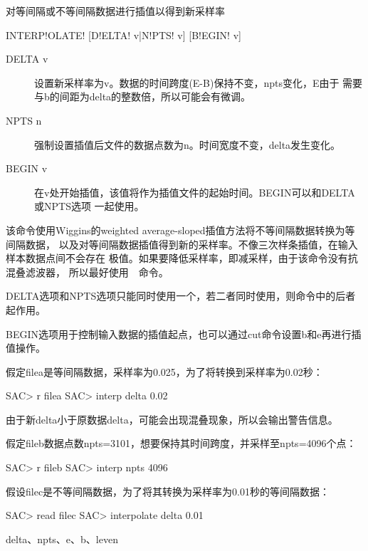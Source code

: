 \label{cmd:interpolate}

对等间隔或不等间隔数据进行插值以得到新采样率

\begin{SACSTX}
INTERP!OLATE! [D!ELTA! v|N!PTS! v] [B!EGIN! v]
\end{SACSTX}

\begin{description}
\item [DELTA v] 设置新采样率为v。数据的时间跨度(E-B)保持不变，npts变化，E由于
    需要与b的间距为delta的整数倍，所以可能会有微调。
\item [NPTS n] 强制设置插值后文件的数据点数为n。时间宽度不变，delta发生变化。
\item [BEGIN v] 在v处开始插值，该值将作为插值文件的起始时间。BEGIN可以和DELTA或NPTS选项
    一起使用。
\end{description}

该命令使用Wiggins的weighted average-sloped插值方法将不等间隔数据转换为等间隔数据，
以及对等间隔数据插值得到新的采样率。不像三次样条插值，在输入样本数据点间不会存在
极值。如果要降低采样率，即减采样，由于该命令没有抗混叠滤波器，
所以最好使用~~命令。

DELTA选项和NPTS选项只能同时使用一个，若二者同时使用，则命令中的后者起作用。

BEGIN选项用于控制输入数据的插值起点，也可以通过cut命令设置b和e再进行插值操作。

假定filea是等间隔数据，采样率为0.025，为了将转换到采样率为0.02秒：
\begin{SACCode}
SAC> r filea
SAC> interp delta 0.02
\end{SACCode}
由于新delta小于原数据delta，可能会出现混叠现象，所以会输出警告信息。

假定fileb数据点数npts=3101，想要保持其时间跨度，并采样至npts=4096个点：
\begin{SACCode}
SAC> r fileb
SAC> interp npts 4096
\end{SACCode}

假设filec是不等间隔数据，为了将其转换为采样率为0.01秒的等间隔数据：
\begin{SACCode}
SAC> read filec
SAC> interpolate delta 0.01
\end{SACCode}

delta、npts、e、b、leven
